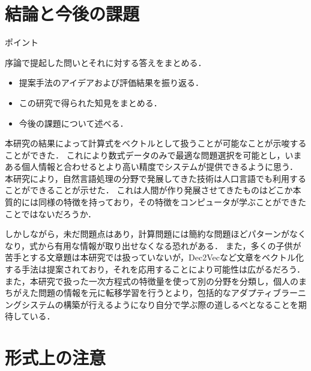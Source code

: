 \documentclass[a4j,11pt,report]{jsbook}
\newcommand{\point}[1]{
\begin{itembox}[l]{ポイント}
  #1
\end{itembox}
}
\begin{document}
\chapter{結論と今後の課題 \label{ch:conclusion}}
\point{
序論で提起した問いとそれに対する答えをまとめる．
\begin{itemize}
  \item 提案手法のアイデアおよび評価結果を振り返る．
  \item この研究で得られた知見をまとめる．
  \item 今後の課題について述べる．
\end{itemize}
}
\fi

本研究の結果によって計算式をベクトルとして扱うことが可能なことが示唆することができた．
これにより数式データのみで最適な問題選択を可能とし，いまある個人情報と合わせるとより高い精度でシステムが提供できるように思う．
本研究により，自然言語処理の分野で発展してきた技術は人口言語でも利用することができることが示せた．
これは人間が作り発展させてきたものはどこか本質的には同様の特徴を持っており，その特徴をコンピュータが学ぶことができたことではないだろうか．

しかしながら，未だ問題点はあり，計算問題には簡約な問題ほどパターンがなくなり，式から有用な情報が取り出せなくなる恐れがある．
また，多くの子供が苦手とする文章題は本研究では扱っていないが，Dec2Vecなど文章をベクトル化する手法は提案されており，それを応用することにより可能性は広がるだろう．
また，本研究で扱った一次方程式の特徴量を使って別の分野を分類し，個人のまちがえた問題の情報を元に転移学習を行うとより，包括的なアダプティブラーニングシステムの構築が行えるようになり自分で学ぶ際の道しるべとなることを期待している．



\chapter{形式上の注意}
\end{document}
